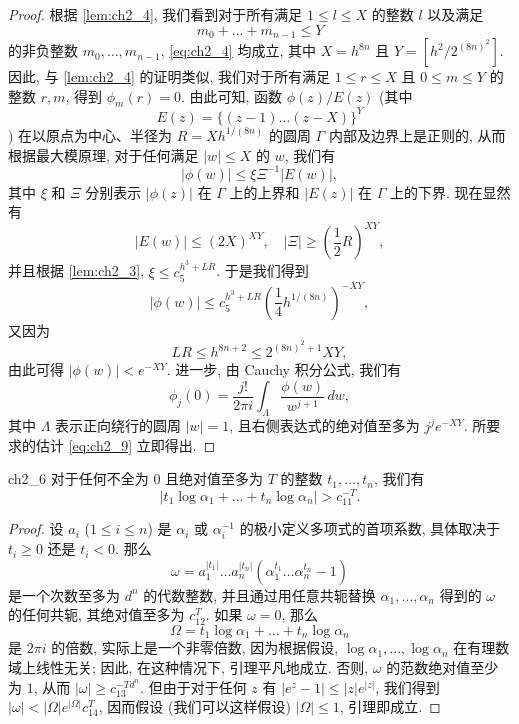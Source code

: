 \begin{proof}
根据 \autoref{lem:ch2_4}, 我们看到对于所有满足 $1 \le l \le X$ 的整数 $l$ 以及满足
\[
m_0 + \dots + m_{n-1} \le Y
\]
的非负整数 $m_0, \dots, m_{n-1}$, \eqref{eq:ch2_4} 均成立, 其中 $X = h^{8n}$ 且 $Y = \left[h^2/2^{(8n)^2}\right]$. 因此, 与 \autoref{lem:ch2_4} 的证明类似, 我们对于所有满足 $1 \le r \le X$ 且 $0 \le m \le Y$ 的整数 $r, m$, 得到 $\phi_m(r) = 0$. 由此可知, 函数 $\phi(z)/E(z)$ (其中
\[
E(z) = \{(z-1) \dots (z-X)\}^Y
\]
) 在以原点为中心、半径为 $R = X h^{1/(8n)}$ 的圆周 $\Gamma$ 内部及边界上是正则的, 从而根据最大模原理, 对于任何满足 $|w| \le X$ 的 $w$, 我们有
\[
|\phi(w)| \le \xi \Xi^{-1} |E(w)|,
\]
其中 $\xi$ 和 $\Xi$ 分别表示 $|\phi(z)|$ 在 $\Gamma$ 上的上界和 $|E(z)|$ 在 $\Gamma$ 上的下界. 现在显然有
\[
|E(w)| \le (2X)^{XY}, \quad |\Xi| \ge \left(\frac{1}{2}R\right)^{XY},
\]
并且根据 \autoref{lem:ch2_3}, $\xi \le c_5^{h^3+LR}$. 于是我们得到
\[
|\phi(w)| \le c_5^{h^3+LR} \left(\frac{1}{4} h^{1/(8n)}\right)^{-XY},
\]
又因为
\[
LR \le h^{8n+2} \le 2^{(8n)^2+1} XY,
\]
由此可得 $|\phi(w)| < e^{-XY}$. 进一步, 由 Cauchy 积分公式, 我们有
\[
\phi_j(0) = \frac{j!}{2\pi i} \int_{\Lambda} \frac{\phi(w)}{w^{j+1}} \, dw,
\]
其中 $\Lambda$ 表示正向绕行的圆周 $|w|=1$, 且右侧表达式的绝对值至多为 $j^j e^{-XY}$. 所要求的估计 \eqref{eq:ch2_9} 立即得出.
\end{proof}

\begin{mylemma}{}{ch2_6}
对于任何不全为 $0$ 且绝对值至多为 $T$ 的整数 $t_1, \dots, t_n$, 我们有
\[
|t_1 \log \alpha_1 + \dots + t_n \log \alpha_n| > c_{11}^{-T}.
\]
\end{mylemma}

\begin{proof}
设 $a_i$ ($1 \le i \le n$) 是 $\alpha_i$ 或 $\alpha_i^{-1}$ 的极小定义多项式的首项系数, 具体取决于 $t_i \ge 0$ 还是 $t_i < 0$. 那么
\[
\omega = a_1^{|t_1|} \dots a_n^{|t_n|} (\alpha_1^{t_1} \dots \alpha_n^{t_n} - 1)
\]
是一个次数至多为 $d^n$ 的代数整数, 并且通过用任意共轭替换 $\alpha_1, \dots, \alpha_n$ 得到的 $\omega$ 的任何共轭, 其绝对值至多为 $c_{12}^T$. 如果 $\omega = 0$, 那么
\[
\Omega = t_1 \log \alpha_1 + \dots + t_n \log \alpha_n
\]
是 $2\pi i$ 的倍数, 实际上是一个非零倍数, 因为根据假设, $\log \alpha_1, \dots, \log \alpha_n$ 在有理数域上线性无关; 因此, 在这种情况下, 引理平凡地成立. 否则, $\omega$ 的范数绝对值至少为 $1$, 从而 $|\omega| \ge c_{13}^{-T d^n}$. 但由于对于任何 $z$ 有 $|e^z - 1| \le |z| e^{|z|}$, 我们得到 $|\omega| < |\Omega| e^{|\Omega|} c_{14}^T$, 因而假设 (我们可以这样假设) $|\Omega| \le 1$, 引理即成立.
\end{proof}

